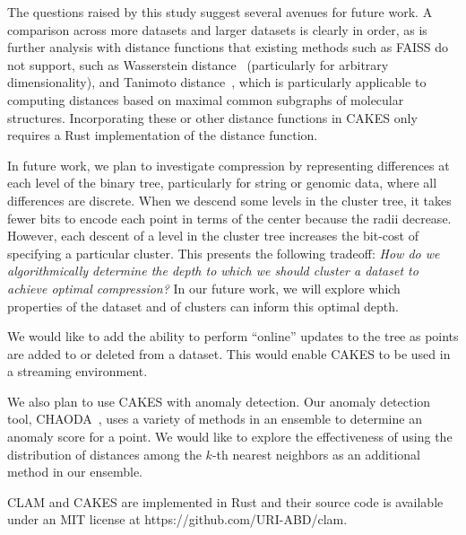 
The questions raised by this study suggest several avenues for future work.
A comparison across more datasets and larger datasets is clearly in order, as is further analysis with distance functions that existing methods such as FAISS do not support, such as Wasserstein distance~\cite{vallender1974calculation} (particularly for arbitrary dimensionality), and Tanimoto distance~\cite{bajusz2015tanimoto}, which is particularly applicable to computing distances based on maximal common subgraphs of molecular structures.  %
Incorporating these or other distance functions in CAKES only requires a Rust implementation of the distance function.


In future work, we plan to investigate compression by representing differences at each level of the binary tree, particularly for string or genomic data, where all differences are discrete.
When we descend some levels in the cluster tree, it takes fewer bits to encode each point in terms of the center because the radii decrease.
However, each descent of a level in the cluster tree increases the bit-cost of specifying a particular cluster. 
This presents the following tradeoff:
\emph{How do we algorithmically determine the depth to which we should cluster a dataset to achieve optimal compression?} 
In our future work, we will explore which properties of the dataset and of clusters can inform this optimal depth.

We would like to add the ability to perform ``online'' updates to the tree as points are added to or deleted from a dataset.
This would enable CAKES to be used in a streaming environment.

We also plan to use CAKES with anomaly detection.
Our anomaly detection tool, CHAODA~\cite{ishaq2021clustered}, uses a variety of methods in an ensemble to determine an anomaly score for a point.
We would like to explore the effectiveness of using the distribution of distances among the $k$-th nearest neighbors as an additional method in our ensemble.

CLAM and CAKES are implemented in Rust and their source code is available under an MIT license at https://github.com/URI-ABD/clam.


